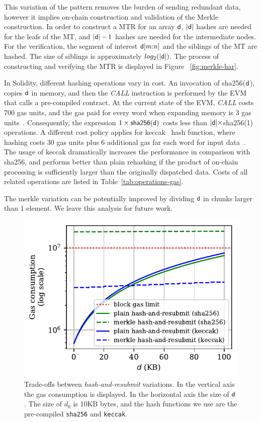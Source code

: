 This variation of the pattern removes the burden of sending redundant data,
however it implies on-chain construction and validation of the Merkle
construction. In order to construct a MTR for an array $\mathsf{d}$,
$|\mathsf{d}|$ hashes are needed for the leafs of the MT, and $|\mathsf{d}| -
1$ hashes are needed for the intermediate nodes. For the verification, the
segment of interest $\mathsf{d}[m{:}n]$ and the siblings of the MT are hashed.
The size of siblings is approximately $log_2(|\mathsf{d}|)$. The process of
constructing and verifying the MTR is displayed in Figure
~\ref{fig:merkle-har}.

In Solidity, different hashing operations vary in cost. An invocation of
\textsf{sha256}($\mathsf{d}$), copies $\mathsf{d}$ in memory, and then the
\emph{CALL} instruction is performed by the EVM that calls a pre-compiled
contract. At the current state of the EVM, \emph{CALL} costs 700 gas units, and
the gas paid for every word when expanding memory is 3 gas units~\cite{wood}.
Consequently, the expression $1 \times \textsf{sha256}(\mathsf{d})$ costs less than
$|\mathsf{d}| \times $\textsf{sha256}(1) operations. A different cost policy applies
for \textsf{keccak}~\cite{keccak} hash function, where hashing costs 30 gas
units plus 6 additional gas far each word for input data~\cite{wood}. The usage
of \textsf{keccak} dramatically increases the performance in comparison with
\textsf{sha256}, and performs better than plain rehashing if the product of
on-chain processing is sufficiently larger than the originally dispatched data.
Costs of all related operations are listed in Table~\ref{tab:operations-gas}.



The merkle variation can be potentially improved by dividing $\mathsf{d}$ in
chunks larger than 1 element. We leave this analysis for future work.

\begin{figure}[H]
    \begin{center}
        \includegraphics[width=0.5\columnwidth]{figures/har-vs-mhar.pdf}
    \end{center}
    \caption{Trade-offs between \emph{hash-and-resubmit} variations. In the
    vertical axis the gas consumption is displayed. In the horizontal axis the
    size of $\mathsf{d}$. The size of $d_0$ is 10KB bytes, and the hash functions we
    use are the pre-compiled \texttt{sha256} and \texttt{keccak}.}
    \label{fig:har-vs-mhar}
\end{figure}


